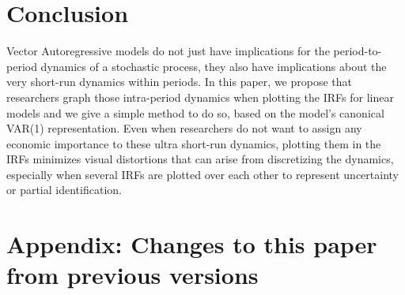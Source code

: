 \documentclass[12pt,fleqn]{article}
\begin{document}
\section{Conclusion}
\label{S4}

Vector Autoregressive models do not just have implications for the
period-to-period dynamics of a stochastic process, they also have
implications about the very short-run dynamics within periods. In this
paper, we propose that researchers graph those intra-period dynamics
when plotting the IRFs for linear models and we give a simple method
to do so, based on the model's canonical VAR(1) representation. Even
when researchers do not want to assign any economic importance to
these ultra short-run dynamics, plotting them in the IRFs minimizes
visual distortions that can arise from discretizing the dynamics,
especially when several IRFs are plotted over each other to
represent uncertainty or partial identification.

\clearpage
{}


\clearpage
\appendix
\section{Appendix: Changes to this paper from previous versions}

\end{document}
